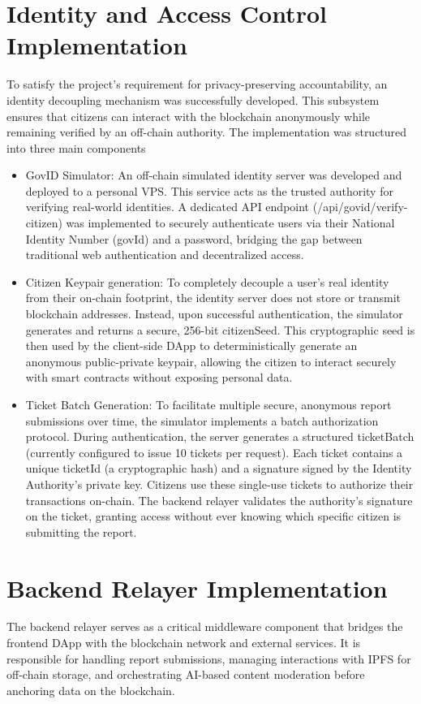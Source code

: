 \section{Identity and Access Control Implementation}

To satisfy the project's requirement for privacy-preserving accountability, an identity decoupling mechanism was successfully developed. This subsystem ensures that citizens can interact with the blockchain anonymously while remaining verified by an off-chain authority. The implementation was structured into three main components

\begin{itemize}
    \item {GovID Simulator:} An off-chain simulated identity server was developed and deployed to a personal \ac{VPS}. This service acts as the trusted authority for verifying real-world identities. A dedicated API endpoint (/api/govid/verify-citizen) was implemented to securely authenticate users via their National Identity Number (govId) and a password, bridging the gap between traditional web authentication and decentralized access.
    \item {Citizen Keypair generation:} To completely decouple a user's real identity from their on-chain footprint, the identity server does not store or transmit blockchain addresses. Instead, upon successful authentication, the simulator generates and returns a secure, 256-bit citizenSeed. This cryptographic seed is then used by the client-side DApp to deterministically generate an anonymous public-private keypair, allowing the citizen to interact securely with smart contracts without exposing personal data.
    \item {Ticket Batch Generation:} To facilitate multiple secure, anonymous report submissions over time, the simulator implements a batch authorization protocol. During authentication, the server generates a structured ticketBatch (currently configured to issue 10 tickets per request). Each ticket contains a unique ticketId (a cryptographic hash) and a signature signed by the Identity Authority's private key. Citizens use these single-use tickets to authorize their transactions on-chain. The backend relayer validates the authority's signature on the ticket, granting access without ever knowing which specific citizen is submitting the report.
\end{itemize}

\section{Backend Relayer Implementation}
The backend relayer serves as a critical middleware component that bridges the frontend DApp with the blockchain network and external services. It is responsible for handling report submissions, managing interactions with IPFS for off-chain storage, and orchestrating AI-based content moderation before anchoring data on the blockchain.

